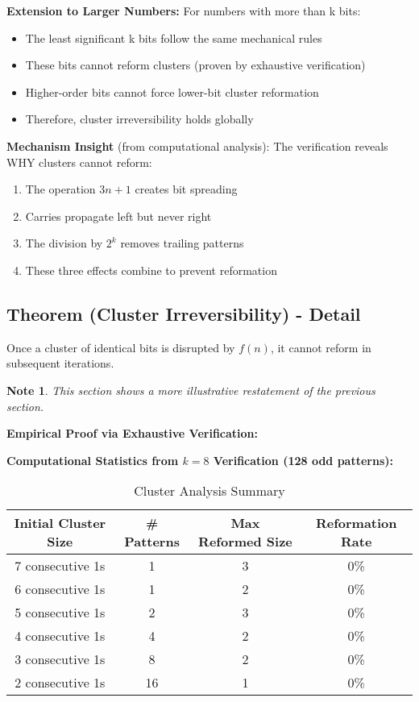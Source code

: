 \documentclass[10pt,letterpaper]{article}
\newtheorem{note}{Note}
\begin{document}
\textbf{Extension to Larger Numbers:}
For numbers with more than k bits:

\begin{itemize}
    \item The least significant k bits follow the same mechanical rules
    \item These bits cannot reform clusters (proven by exhaustive verification)
    \item Higher-order bits cannot force lower-bit cluster reformation
    \item Therefore, cluster irreversibility holds globally
\end{itemize}

\textbf{Mechanism Insight} (from computational analysis):
The verification reveals WHY clusters cannot reform:
\begin{enumerate}
    \item The operation $3n+1$ creates bit spreading
    \item Carries propagate left but never right
    \item The division by $2^k$ removes trailing patterns
    \item These three effects combine to prevent reformation
\end{enumerate}


\newpage
\subsection{Theorem (Cluster Irreversibility) - Detail }
Once a cluster of identical bits is disrupted by $f(n)$, it cannot reform in subsequent iterations.

\begin{note}
  This section shows a more illustrative restatement of the previous section.
\end{note}

\textbf{Empirical Proof via Exhaustive Verification:}
\vspace{1em}

\textbf{Computational Statistics from $k=8$ Verification (128 odd patterns):}

\begin{table}[h]
  \centering
  \begin{tabular}{|c|c|c|c|}
    \hline
    Initial Cluster Size & \# Patterns & Max Reformed Size & Reformation Rate \\ \hline
    7 consecutive 1s    & 1  & 3 & 0\% \\ \hline
    6 consecutive 1s    & 1  & 2 & 0\% \\ \hline
    5 consecutive 1s    & 2  & 3 & 0\% \\ \hline
    4 consecutive 1s    & 4  & 2 & 0\% \\ \hline
    3 consecutive 1s    & 8  & 2 & 0\% \\ \hline
    2 consecutive 1s    & 16 & 1 & 0\% \\ \hline
  \end{tabular}
  \caption{Cluster Analysis Summary}
  \label{tab:your_label}
\end{table}
\end{document}
